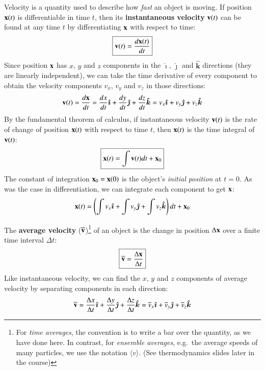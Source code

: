\documentclass[11pt]{article}
\newcommand{\mb}[1]{\ensuremath\mathbf{#1}}
\begin{document}
Velocity is a quantity used to describe how \emph{fast} an object is moving. If
position $\mb{x}(t)$ is differentiable in time $t$, then its
\textbf{instantaneous velocity} $\mb{v}(t)$ can be found at any time $t$ by
differentiating $\mb{x}$ with respect to time: %
\begin{equation}
  \boxed{\mb{v}(t)= \frac{d\mb{x}(t)}{dt}}
\end{equation}
Since position $\mb{x}$ has $x$, $y$ and $z$ components in the
$\bm{\hat{\imath}}$, $\bm{\hat{\jmath}}$ and $\bm{\hat{k}}$ directions (they
are linearly independent), we can take the time derivative of every component
to obtain the velocity components $v_x$, $v_y$ and $v_z$ in those directions:
\begin{equation*}
  \mb{v}(t)= \frac{d\mb{x}}{dt}=
  \frac{dx}{dt}\bm{\hat{\imath}} +
  \frac{dy}{dt}\bm{\hat{\jmath}} + \frac{dz}{dt}\bm{\hat{k}}=
  v_x\bm{\hat{\imath}} + v_y\bm{\hat{\jmath}} + v_z\bm{\hat{k}}
\end{equation*}
By the fundamental theorem of calculus, %
if instantaneous velocity $\mb{v}(t)$ is the rate of change of position
$\mb{x}(t)$ with respect to time $t$, then $\mb{x}(t)$ is the time integral of
$\mb{v}(t)$:
\begin{equation}
  \boxed{\mb{x}(t)=\int\mb{v}(t)dt + \mb{x}_0}
\end{equation}
The constant of integration $\mb{x}_0=\mb{x}(0)$ is the object's
\emph{initial position} at $t=0$. As was the case in differentiation,
we can integrate each component to get $\mb{x}$:
\begin{equation*}
  \mb{x}(t)= \left(
  \int v_x\bm{\hat{\imath}} + \int v_y\bm{\hat{\jmath}} + \int v_z\bm{\hat{k}}
  \right) dt + \mb{x}_0
\end{equation*}


The \textbf{average velocity} ($\overline{\mb{v}}$)\footnote{For
  \emph{time averages}, the convention is to write a bar over the quantity, as
  we have done here. In contrast, for \emph{ensemble averages}, e.g.\ the
  average speeds of many particles, we use the notation
  $\big\langle v\big\rangle$. (See thermodynamics slides later in the course)}
of an object is the change in position $\Delta\mb{x}$ over a finite time
interval $\Delta t$:
\begin{equation}
  \boxed{\overline{\mb{v}}= \frac{\Delta\mb{x}}{\Delta t}}
\end{equation}
Like instantaneous velocity, we can find the $x$, $y$ and $z$ components of
average velocity by separating components in each direction:
\begin{equation*}
  \overline{\mb{v}}=
  \frac{\Delta x}{\Delta t}\bm{\hat{\imath}} +
  \frac{\Delta y}{\Delta t}\bm{\hat{\jmath}} +
  \frac{\Delta z}{\Delta t}\bm{\hat{k}} =
  \overline{v}_x\bm{\hat{\imath}} +
  \overline{v}_y\bm{\hat{\jmath}} +
  \overline{v}_z\bm{\hat{k}}
\end{equation*}
%
%
%
\end{document}
